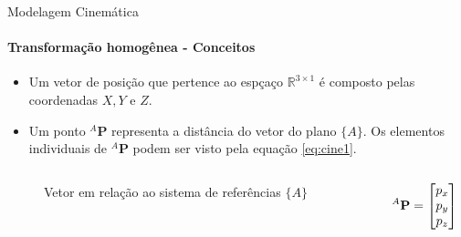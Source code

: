 \documentclass[aspectratio=169]{beamer}
\begin{document}
\begin{frame}{Modelagem Cinemática}
    \framesubtitle{Transformação homogênea - Conceitos}
    \begin{itemize}
        \item Um vetor de posição que pertence ao espçaço $\mathbb{R}^{3 \times 1}$ é composto pelas coordenadas $X,Y$ e $Z$.
        \item Um ponto ${}^A\mathbf{P}$ representa a distância do vetor do plano $\{A\}$. Os elementos individuais de ${}^A\mathbf{P}$ podem ser visto pela equação \eqref{eq:cine1}.
    \end{itemize}
    \begin{columns}[c]
        \begin{column}{0.6\textwidth}
            \begin{figure}
                \centering
                \caption{Vetor em relação ao sistema de referências $\{A\}$}
                \label{fig:cine1f}
            \end{figure}
        \end{column}
        \begin{column}{0.3\textwidth}
            \begin{equation}\label{eq:cine1}
                \color{black}{{}^A\mathbf{P} = \begin{bmatrix}
                    p_x \\ p_y \\ p_z
                \end{bmatrix}}
                \color{gray}{}
            \end{equation}
        \end{column}
    \end{columns}
\end{frame}
\end{document}
